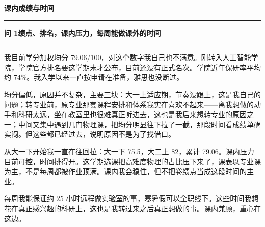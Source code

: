 \documentclass[UTF8,a4paper,11pt,fontset=none]{ctexart}
\newcommand{\ask}[1]{%
  \par\vspace{2mm}%
  {\noindent\fontsize{13}{18}\selectfont\bfseries #1\par}
  \nobreak\vspace{1.2mm}%
  {\color{ink}\noindent\rule{\linewidth}{0.45pt}\par}
  \nobreak\vspace{2.8mm}%
}
\begin{document}
\color{ink}

\begin{center}
{\fontsize{18}{24}\selectfont\bfseries 课内成绩与时间}\\[2.8mm]
{\color{ink}\rule{0.28\textwidth}{0.4pt}}
\end{center}

\vspace{2.5mm}

\ask{问 1\quad 绩点、排名，课内压力，每周能做课外的时间}

\noindent
我目前学分加权均分 79.06/100，对这个数字我自己也不满意。刚转入人工智能学院，学院官方排名要这学期末才公布，目前还没有正式名次。学院近年保研率平均约 74\%。我入学以来一直按申请在准备，雅思也没断过。

\vspace{2.4mm}
\noindent
均分偏低，原因并不复杂，主要三块：大一上适应期，节奏没跟上，这是我自己的问题；转专业前，原专业那套课程安排和体系我实在喜欢不起来——离我想做的动手和科研太远，坐在教室里也很难真正听进去，这也是我后来想转专业的原因之一；中间又集中遇到几门物理课，把均分明显往下拉了一截，那段时间看成绩单确实闷。但这些都已经过去，说明原因不是为了找借口。

\vspace{2.4mm}
\noindent
从大一下开始我一直在往回拉：大一下 75.5，大二上 82，累计 79.06。课内压力目前可控，时间排得开。这学期选课把高难度物理的占比压下来了，课表以专业课为主，不是每周都被作业顶满。课内我会稳住，但不把卷绩点当成这段时间的主业。

\vspace{2.4mm}
\noindent
每周我能保证约 25 小时远程做实验室的事，寒暑假可以全职线下。这些时间我想花在真正感兴趣的科研上，这也是我转过来之后真正想做的事。课内兼顾，重心在这边。
\end{document}
